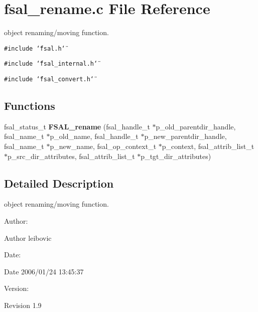 \section{fsal\_\-rename.c File Reference}
\label{fsal__rename_8c}
object renaming/moving function.  


{\tt \#include \char`\"{}fsal.h\char`\"{}}\par
{\tt \#include \char`\"{}fsal\_\-internal.h\char`\"{}}\par
{\tt \#include \char`\"{}fsal\_\-convert.h\char`\"{}}\par
\subsection*{Functions}
\begin{CompactItemize}
\item 
fsal\_\-status\_\-t {\bf FSAL\_\-rename} (fsal\_\-handle\_\-t $\ast$p\_\-old\_\-parentdir\_\-handle, fsal\_\-name\_\-t $\ast$p\_\-old\_\-name, fsal\_\-handle\_\-t $\ast$p\_\-new\_\-parentdir\_\-handle, fsal\_\-name\_\-t $\ast$p\_\-new\_\-name, fsal\_\-op\_\-context\_\-t $\ast$p\_\-context, fsal\_\-attrib\_\-list\_\-t $\ast$p\_\-src\_\-dir\_\-attributes, fsal\_\-attrib\_\-list\_\-t $\ast$p\_\-tgt\_\-dir\_\-attributes)
\end{CompactItemize}


\subsection{Detailed Description}
object renaming/moving function. 

\begin{Desc}
\item[Author:]\end{Desc}
\begin{Desc}
\item[Author]leibovic \end{Desc}
\begin{Desc}
\item[Date:]\end{Desc}
\begin{Desc}
\item[Date]2006/01/24 13:45:37 \end{Desc}
\begin{Desc}
\item[Version:]\end{Desc}
\begin{Desc}
\item[Revision]1.9 \end{Desc}


